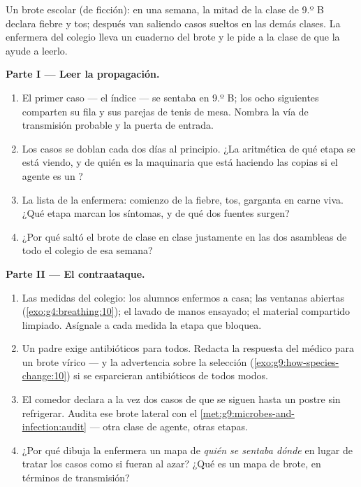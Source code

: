\begin{problem}\label{pb:g9:microbes-and-infection:1}
Un brote escolar (de ficción): en una semana, la mitad de la clase de
9.º B declara fiebre y tos; después van saliendo casos sueltos en las
demás clases. La enfermera del colegio lleva un cuaderno del brote y le
pide a la clase de  que la ayude a leerlo.

\medskip\noindent\textbf{Parte I --- Leer la propagación.}
\begin{enumerate}
  \item El primer caso --- el índice --- se sentaba en 9.º B; los ocho
        siguientes comparten su fila y sus parejas de tenis de mesa.
        Nombra la vía de transmisión probable y la puerta de entrada.
  \item Los casos se doblan cada dos días al principio. ¿La aritmética
        de qué etapa se está viendo, y de quién es la maquinaria que
        está haciendo las copias si el agente es un ?
  \item La lista de la enfermera: comienzo de la fiebre, tos, garganta
        en carne viva. ¿Qué etapa marcan los síntomas, y de qué dos
        fuentes surgen?
  \item ¿Por qué saltó el brote de clase en clase justamente en las dos
        asambleas de todo el colegio de esa semana?
\end{enumerate}

\medskip\noindent\textbf{Parte II --- El contraataque.}
\begin{enumerate}[resume]
  \item Las medidas del colegio: los alumnos enfermos a casa; las
        ventanas abiertas (\cref{exo:g4:breathing:10}); el lavado de
        manos ensayado; el material compartido limpiado. Asígnale a
        cada medida la etapa que bloquea.
  \item Un padre exige antibióticos para todos. Redacta la respuesta
        del médico para un brote vírico --- y la advertencia sobre la
        selección (\cref{exo:g9:how-species-change:10}) si se
        esparcieran antibióticos de todos modos.
  \item El comedor declara a la vez dos casos de  que se siguen
        hasta un postre sin refrigerar. Audita ese brote lateral con el
        \cref{met:g9:microbes-and-infection:audit} --- otra clase de
        agente, otras etapas.
  \item ¿Por qué dibuja la enfermera un mapa de \emph{quién se sentaba
        dónde} en lugar de tratar los casos como si fueran al azar?
        ¿Qué es un mapa de brote, en términos de transmisión?
\end{enumerate}


\end{problem}
